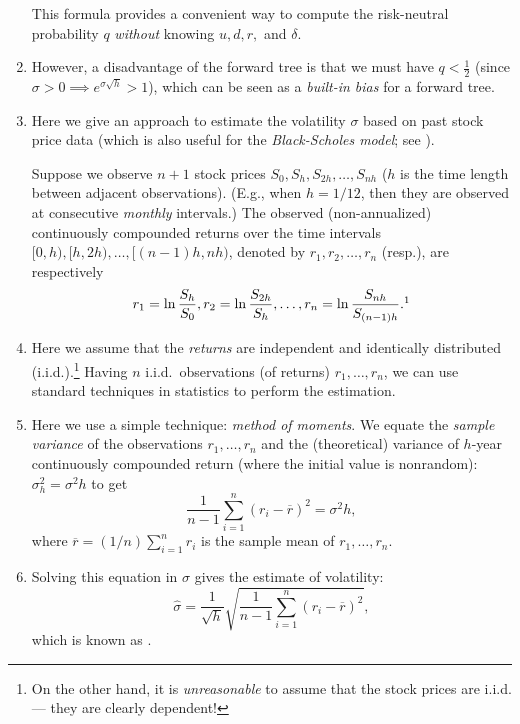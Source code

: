 \begin{enumerate}
This formula provides a convenient way to compute the risk-neutral probability
\(q\) \emph{without} knowing \(u, d, r,\) and \(\delta\).

\item However, a disadvantage of the forward tree is that we must have
\(q<\frac{1}{2}\) (since \(\sigma>0\implies e^{\sigma\sqrt{h}}>1\)), which can
be seen as a \emph{built-in bias} for a forward tree.
\item \label{it:estimate-vol}
Here we give an approach to estimate the volatility \(\sigma\) based on past
stock price data (which is also useful for the \emph{Black-Scholes model};
see ).

Suppose we observe \(n+1\) stock prices \(S_0, S_h, S_{2h},\dotsc,S_{nh}\)
(\(h\) is the time length between adjacent observations). (E.g., when
\(h=1/12\), then they are observed at consecutive \emph{monthly} intervals.)
The observed (non-annualized) continuously compounded returns over the time
intervals \([0,h),[h,2h),\dotsc,[(n-1)h,nh)\), denoted by
\(r_{1},r_{2},\dotsc,r_{n}\) (resp.), are respectively
\[
r_1=\ln \frac{S_{h}}{S_{0}}, r_2=\ln \frac{S_{2h}}{S_{h}},\dotsc, r_n=\ln
\frac{S_{nh}}{S_{(n-1)h}}.\footnote{These observations can be treated as
observations from \(n\) ``experiments'' conducted ``naturally'' in the market
at the past. At each initial time point \(i\) (the beginning of the time
interval \([i,i+h)\)), the stock price \(S_i\) is known to the market
participants, while the stock price \(S_{i+h}\) at time \(i+h\) is unknown
(random) to them at that moment \faIcon{arrow-right} the \(h\)-year
log return here ``matches'' with the one mentioned in
\labelcref{it:volatility}.

Then, each observed value \(r_i\) can be seen as an ``observation'' from that
random \(h\)-year log return in \labelcref{it:volatility} in the
``experiment''.
}
\]

\item Here we assume that the \emph{returns} are independent and identically
distributed (i.i.d.).\footnote{On the other hand, it is \emph{unreasonable} to
assume that the stock prices are i.i.d. --- they are clearly dependent!} Having
\(n\) i.i.d.\ observations (of returns) \(r_1,\dotsc,r_n\), we can use standard
techniques in statistics to perform the estimation.

\item Here we use a simple technique: \emph{method of moments}. We equate the
\emph{sample variance} of the observations \(r_1,\dotsc,r_n\) and the
(theoretical) variance of \(h\)-year continuously compounded return (where the
initial value is nonrandom): \(\sigma_h^2=\sigma^2h\) to get
\[
\frac{1}{n-1}\sum_{i=1}^{n}(r_i-\overline{r})^2=\sigma^2h,
\]
where \(\overline{r}=(1/n)\sum_{i=1}^{n}r_i\) is the sample mean of
\(r_1,\dotsc,r_n\).

\item \label{it:vol-mom-est-fmla}
Solving this equation in \(\sigma\) gives the estimate of volatility:
\[\widehat{\sigma}
=\frac{1}{\sqrt{h}}\sqrt{\frac{1}{n-1}\sum_{i=1}^{n}(r_i-\overline{r})^2},\]
which is known as .
\end{enumerate}
